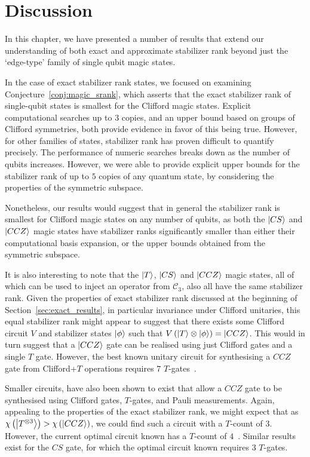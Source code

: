 \section{Discussion}\label{sec:srank_discussion}
In this chapter, we have presented a number of results that extend our understanding of both exact and approximate stabilizer rank beyond just the `edge-type' family of single qubit magic states.\par
In the case of exact stabilizer rank states, we focused on examining Conjecture~\ref{conj:magic_srank}, which asserts that the exact stabilizer rank of single-qubit states is smallest for the Clifford magic states. Explicit computational searches up to $3$ copies, and an upper bound based on groups of Clifford symmetries, both provide evidence in favor of this being true.
However, for other families of states, stabilizer rank has proven difficult to quantify precisely. The performance of numeric searches breaks down as the number of qubits increases. However, we were able to provide explicit upper bounds for the stabilizer rank of up to $5$ copies of any quantum state, by considering the properties of the symmetric subspace.\par
Nonetheless, our results would suggest that in general the stabilizer rank is smallest for Clifford magic states on any number of qubits, as both the $\ket{CS}$ and $\ket{CCZ}$ magic states have stabilizer ranks significantly smaller than either their computational basis expansion, or the upper bounds obtained from the symmetric subspace.\par
It is also interesting to note that the $\ket{T}$, $\ket{CS}$ and $\ket{CCZ}$ magic states, all of which can be used to inject an operator from $\mathcal{C}_{3}$, also all have the same stabilizer rank. Given the properties of exact stabilizer rank discussed at the beginning of Section~\ref{sec:exact_results}, in particular invariance under Clifford unitaries, this equal stabilizer rank might appear to suggest that there exists some Clifford circuit $V$ and stabilizer states $\ket{\phi}$ such that $V\left(\ket{T}\otimes\ket{\phi}\right)=\ket{CCZ}$. This would in turn suggest that a $\ket{CCZ}$ gate can be realised using just Clifford gates and a single $T$ gate. However, the best known unitary circuit for synthesising a $CCZ$ gate from Clifford+$T$ operations requires $7$ $T$-gates~\cite{Nielsen2000}.\par
Smaller circuits, have also been shown to exist that allow a $CCZ$ gate to be synthesised using Clifford gates, $T$-gates, and Pauli measurements. Again, appealing to the properties of the exact stabilizer rank, we might expect that as $\chi\left(\ket{T^{\otimes 3}}\right)>\chi\left(\ket{CCZ}\right)$, we could find such a circuit with a $T$-count of $3$. However, the current optimal circuit known has a $T$-count of $4$~\cite{Jones2013}. Similar results exist for the $CS$ gate, for which the optimal circuit known requires $3$ $T$-gates.\par

